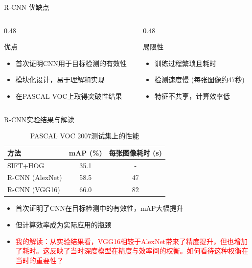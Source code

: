\documentclass{beamer}
\begin{document}
\begin{frame}{R-CNN 优缺点}
    \begin{columns}[T] %
        \begin{column}{0.48\textwidth}
            \begin{block}{优点}
                \begin{itemize}
                    \item 首次证明CNN用于目标检测的有效性
                    \item 模块化设计，易于理解和实现
                    \item 在PASCAL VOC上取得突破性结果
                \end{itemize}
            \end{block}
        \end{column}
        \hfill %
        \begin{column}{0.48\textwidth}
            \begin{block}{局限性}
                \begin{itemize}
                    \item 训练过程繁琐且耗时
                    \item 检测速度慢 (每张图像约47秒)
                    \item 特征不共享，计算效率低
                \end{itemize}
            \end{block}
        \end{column}
    \end{columns}
\end{frame}

\begin{frame}{R-CNN实验结果与解读}
    \begin{table}
        \centering
        \caption{PASCAL VOC 2007测试集上的性能}
        \begin{tabular}{lcc}
            \toprule
            方法 & mAP (\%) & 每张图像耗时 (s) \\
            \midrule
            SIFT+HOG & 35.1 & - \\
            R-CNN (AlexNet) & 58.5 & 47 \\
            R-CNN (VGG16) & 66.0 & 82 \\
            \bottomrule
        \end{tabular}
    \end{table}
    
    \begin{itemize}
        \item 首次证明了CNN在目标检测中的有效性，mAP大幅提升
        \item 但计算效率成为实际应用的瓶颈
        \item \textcolor{red}{我的解读：从实验结果看，VGG16相较于AlexNet带来了精度提升，但也增加了耗时。这反映了当时深度模型在精度与效率间的权衡。如何看待这种权衡在当时的重要性？}
    \end{itemize}
\end{frame}
\end{document}
